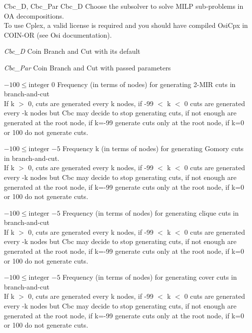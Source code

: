 %
{Cbc\_D, Cbc\_Par}%
{Cbc\_D}%
{Choose the subsolver to solve MILP sub-problems in OA decompositions.\\
 To use Cplex, a valid license is required and you should have compiled OsiCpx in COIN-OR  (see Osi documentation).}%
{\begin{list}{}{
\setlength{\parsep}{0em}
\setlength{\leftmargin}{3ex}
\setlength{\labelwidth}{1ex}
\setlength{\itemindent}{0ex}
\setlength{\topsep}{0pt}}
\item[\textit{Cbc\_D}] Coin Branch and Cut with its default
\item[\textit{Cbc\_Par}] Coin Branch and Cut with passed parameters
\end{list}
}

%
{$-100\leq\textrm{integer}$}%
{$0$}%
{Frequency (in terms of nodes) for generating 2-MIR cuts in branch-and-cut\\
If k $>$ 0, cuts are generated every k nodes, if -99 $<$ k $<$ 0 cuts are generated every -k nodes but Cbc may decide to stop generating cuts, if not enough are generated at the root node, if k=-99 generate cuts only at the root node, if k=0 or 100 do not generate cuts.}%
{}

%
{$-100\leq\textrm{integer}$}%
{$-5$}%
{Frequency k (in terms of nodes) for generating Gomory cuts in branch-and-cut.\\
If k $>$ 0, cuts are generated every k nodes, if -99 $<$ k $<$ 0 cuts are generated every -k nodes but Cbc may decide to stop generating cuts, if not enough are generated at the root node, if k=-99 generate cuts only at the root node, if k=0 or 100 do not generate cuts.}%
{}

%
{$-100\leq\textrm{integer}$}%
{$-5$}%
{Frequency (in terms of nodes) for generating clique cuts in branch-and-cut\\
If k $>$ 0, cuts are generated every k nodes, if -99 $<$ k $<$ 0 cuts are generated every -k nodes but Cbc may decide to stop generating cuts, if not enough are generated at the root node, if k=-99 generate cuts only at the root node, if k=0 or 100 do not generate cuts.}%
{}

%
{$-100\leq\textrm{integer}$}%
{$-5$}%
{Frequency (in terms of nodes) for generating cover cuts in branch-and-cut\\
If k $>$ 0, cuts are generated every k nodes, if -99 $<$ k $<$ 0 cuts are generated every -k nodes but Cbc may decide to stop generating cuts, if not enough are generated at the root node, if k=-99 generate cuts only at the root node, if k=0 or 100 do not generate cuts.}%
{}

